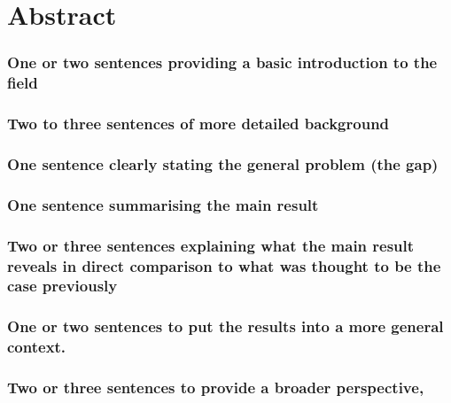 \clearpage







\section{Abstract}


\subsubsection{One or two sentences providing a basic introduction to the field}



\subsubsection{Two to three sentences of more detailed background}


\subsubsection{One sentence clearly stating the general problem (the gap)}


\subsubsection{One sentence summarising the main result}


\subsubsection{Two or three sentences explaining what the main result reveals in direct comparison to what was thought to be the case previously}


\subsubsection{One or two sentences to put the results into a more general context.}



\subsubsection{Two or three sentences to provide a broader perspective, }



